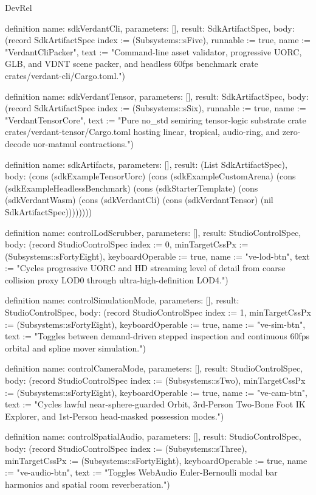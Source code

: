 \begin{lexlean}{DevRel}
\begin{semanticmodule}
definition{
  name: sdkVerdantCli,
  parameters: [],
  result: SdkArtifactSpec,
  body: (record SdkArtifactSpec {index := (Subsystems::sFive), runnable := true, name := "VerdantCliPacker", text := "Command-line asset validator, progressive UORC, GLB, and VDNT scene packer, and headless 60fps benchmark crate crates/verdant-cli/Cargo.toml."})
}

definition{
  name: sdkVerdantTensor,
  parameters: [],
  result: SdkArtifactSpec,
  body: (record SdkArtifactSpec {index := (Subsystems::sSix), runnable := true, name := "VerdantTensorCore", text := "Pure no_std semiring tensor-logic substrate crate crates/verdant-tensor/Cargo.toml hosting linear, tropical, audio-ring, and zero-decode uor-matmul contractions."})
}

definition{
  name: sdkArtifacts,
  parameters: [],
  result: (List SdkArtifactSpec),
  body: (cons (sdkExampleTensorUorc) (cons (sdkExampleCustomArena) (cons (sdkExampleHeadlessBenchmark) (cons (sdkStarterTemplate) (cons (sdkVerdantWasm) (cons (sdkVerdantCli) (cons (sdkVerdantTensor) (nil SdkArtifactSpec))))))))
}

definition{
  name: controlLodScrubber,
  parameters: [],
  result: StudioControlSpec,
  body: (record StudioControlSpec {index := 0, minTargetCssPx := (Subsystems::sFortyEight), keyboardOperable := true, name := "ve-lod-btn", text := "Cycles progressive UORC and HD streaming level of detail from coarse collision proxy LOD0 through ultra-high-definition LOD4."})
}

definition{
  name: controlSimulationMode,
  parameters: [],
  result: StudioControlSpec,
  body: (record StudioControlSpec {index := 1, minTargetCssPx := (Subsystems::sFortyEight), keyboardOperable := true, name := "ve-sim-btn", text := "Toggles between demand-driven stepped inspection and continuous 60fps orbital and spline mover simulation."})
}

definition{
  name: controlCameraMode,
  parameters: [],
  result: StudioControlSpec,
  body: (record StudioControlSpec {index := (Subsystems::sTwo), minTargetCssPx := (Subsystems::sFortyEight), keyboardOperable := true, name := "ve-cam-btn", text := "Cycles lawful near-sphere-guarded Orbit, 3rd-Person Two-Bone Foot IK Explorer, and 1st-Person head-masked possession modes."})
}

definition{
  name: controlSpatialAudio,
  parameters: [],
  result: StudioControlSpec,
  body: (record StudioControlSpec {index := (Subsystems::sThree), minTargetCssPx := (Subsystems::sFortyEight), keyboardOperable := true, name := "ve-audio-btn", text := "Toggles WebAudio Euler-Bernoulli modal bar harmonics and spatial room reverberation."})
}


\end{semanticmodule}
\end{lexlean}
